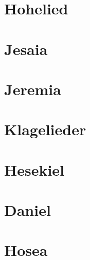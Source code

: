 \chapter{Hohelied}
\begin{multicols}{2}
  \raggedcolumns
  \parskip=0pt \relax
  
\end{multicols}

\chapter{Jesaia}
\begin{multicols}{2}
  \raggedcolumns
  \parskip=0pt \relax
  
\end{multicols}

\chapter{Jeremia}
\begin{multicols}{2}
  \raggedcolumns
  \parskip=0pt \relax
  
\end{multicols}

\chapter{Klagelieder}
\begin{multicols}{2}
  \raggedcolumns
  \parskip=0pt \relax
  
\end{multicols}

\chapter{Hesekiel}
\begin{multicols}{2}
  \raggedcolumns
  \parskip=0pt \relax
  
\end{multicols}

\chapter{Daniel}
\begin{multicols}{2}
  \raggedcolumns
  \parskip=0pt \relax
  
\end{multicols}

\chapter{Hosea}
\begin{multicols}{2}
  \raggedcolumns
  \parskip=0pt \relax
  
\end{multicols}

